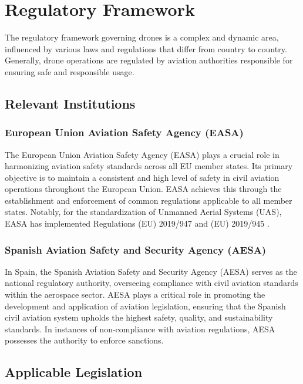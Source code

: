\chapter{Regulatory Framework}
\label{ch:regulatory_framework}

The regulatory framework governing drones is a complex and dynamic area, influenced by various laws and regulations that differ from country to country. Generally, drone operations are regulated by aviation authorities responsible for ensuring safe and responsible usage.

\section{Relevant Institutions}

\subsection{European Union Aviation Safety Agency (EASA)}
The European Union Aviation Safety Agency (EASA) \autocite{eu-1139-2018} plays a crucial role in harmonizing aviation safety standards across all EU member states. Its primary objective is to maintain a consistent and high level of safety in civil aviation operations throughout the European Union. EASA achieves this through the establishment and enforcement of common regulations applicable to all member states. Notably, for the standardization of Unmanned Aerial Systems (UAS), EASA has implemented Regulations (EU) 2019/947 \autocite{eu-947-2019} and (EU) 2019/945 \autocite{eu-945-2019}.

\subsection{Spanish Aviation Safety and Security Agency (AESA)}
In Spain, the Spanish Aviation Safety and Security Agency (AESA) \autocite{sp-184-2008} serves as the national regulatory authority, overseeing compliance with civil aviation standards within the aerospace sector. AESA plays a critical role in promoting the development and application of aviation legislation, ensuring that the Spanish civil aviation system upholds the highest safety, quality, and sustainability standards. In instances of non-compliance with aviation regulations, AESA possesses the authority to enforce sanctions.

\section{Applicable Legislation}

